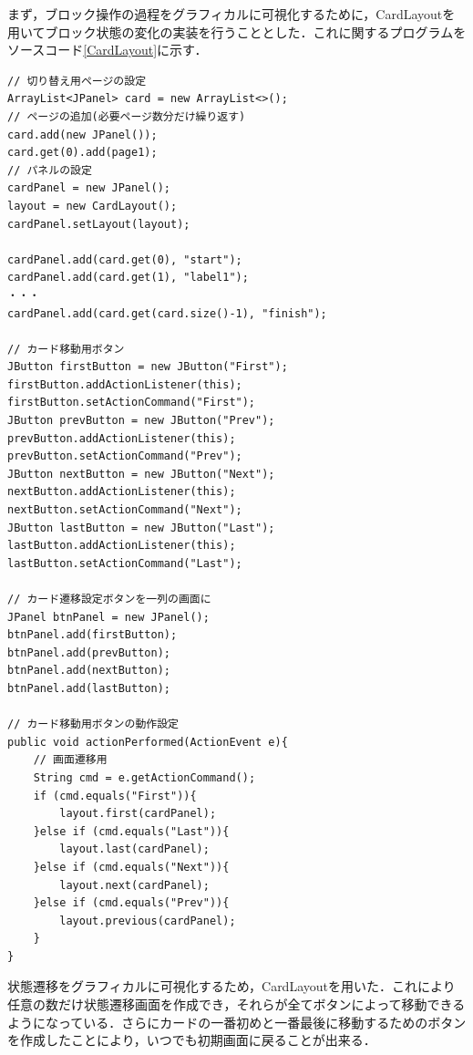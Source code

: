 \documentclass[12pt]{jarticle}
\begin{document}
まず，ブロック操作の過程をグラフィカルに可視化するために，CardLayoutを用いてブロック状態の変化の実装を行うこととした．これに関するプログラムをソースコード\ref{CardLayout}に示す．
\begin{lstlisting}[caption=CardLayout関連プログラム,label=CardLayout]
// 切り替え用ページの設定
ArrayList<JPanel> card = new ArrayList<>();
// ページの追加(必要ページ数分だけ繰り返す)
card.add(new JPanel()); 
card.get(0).add(page1);
// パネルの設定
cardPanel = new JPanel();
layout = new CardLayout();
cardPanel.setLayout(layout);

cardPanel.add(card.get(0), "start");
cardPanel.add(card.get(1), "label1");
・・・
cardPanel.add(card.get(card.size()-1), "finish");

// カード移動用ボタン
JButton firstButton = new JButton("First");
firstButton.addActionListener(this);
firstButton.setActionCommand("First");
JButton prevButton = new JButton("Prev");
prevButton.addActionListener(this);
prevButton.setActionCommand("Prev");
JButton nextButton = new JButton("Next");
nextButton.addActionListener(this);
nextButton.setActionCommand("Next");
JButton lastButton = new JButton("Last");
lastButton.addActionListener(this);
lastButton.setActionCommand("Last");

// カード遷移設定ボタンを一列の画面に
JPanel btnPanel = new JPanel();
btnPanel.add(firstButton);
btnPanel.add(prevButton);
btnPanel.add(nextButton);
btnPanel.add(lastButton);

// カード移動用ボタンの動作設定
public void actionPerformed(ActionEvent e){
	// 画面遷移用
	String cmd = e.getActionCommand();
	if (cmd.equals("First")){
		layout.first(cardPanel);
	}else if (cmd.equals("Last")){
		layout.last(cardPanel);
	}else if (cmd.equals("Next")){
		layout.next(cardPanel);
	}else if (cmd.equals("Prev")){
		layout.previous(cardPanel);
	}
}
\end{lstlisting}
状態遷移をグラフィカルに可視化するため，CardLayoutを用いた．これにより任意の数だけ状態遷移画面を作成でき，それらが全てボタンによって移動できるようになっている．さらにカードの一番初めと一番最後に移動するためのボタンを作成したことにより，いつでも初期画面に戻ることが出来る．
\end{document}
